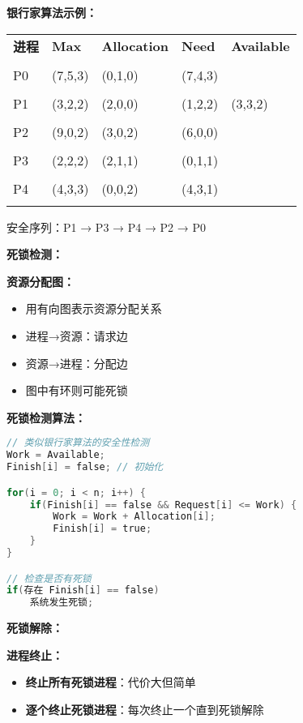 \documentclass[lang=cn,newtx,10pt,scheme=chinese]{../../elegantbook}
\begin{document}
\textbf{银行家算法示例：}
\begin{longtable}{@{}p{1.5cm}p{2cm}p{2cm}p{2cm}p{2cm}@{}}
\toprule
\textbf{进程} & \textbf{Max} & \textbf{Allocation} & \textbf{Need} & \textbf{Available} \\\\ \midrule
\endhead

P0 & (7,5,3) & (0,1,0) & (7,4,3) & \multirow{5}{*}{(3,3,2)} \\\\
P1 & (3,2,2) & (2,0,0) & (1,2,2) & \\\\
P2 & (9,0,2) & (3,0,2) & (6,0,0) & \\\\
P3 & (2,2,2) & (2,1,1) & (0,1,1) & \\\\
P4 & (4,3,3) & (0,0,2) & (4,3,1) & \\\\

\bottomrule
\end{longtable}

安全序列：P1 → P3 → P4 → P2 → P0

\textbf{死锁检测：}

\textbf{资源分配图：}
\begin{itemize}
  \item 用有向图表示资源分配关系
  \item 进程→资源：请求边
  \item 资源→进程：分配边
  \item 图中有环则可能死锁
\end{itemize}

\textbf{死锁检测算法：}
\begin{lstlisting}[language=C]
// 类似银行家算法的安全性检测
Work = Available;
Finish[i] = false; // 初始化

for(i = 0; i < n; i++) {
    if(Finish[i] == false && Request[i] <= Work) {
        Work = Work + Allocation[i];
        Finish[i] = true;
    }
}

// 检查是否有死锁
if(存在 Finish[i] == false)
    系统发生死锁;
\end{lstlisting}

\textbf{死锁解除：}

\textbf{进程终止：}
\begin{itemize}
  \item \textbf{终止所有死锁进程}：代价大但简单
  \item \textbf{逐个终止死锁进程}：每次终止一个直到死锁解除
\end{itemize}
\end{document}
